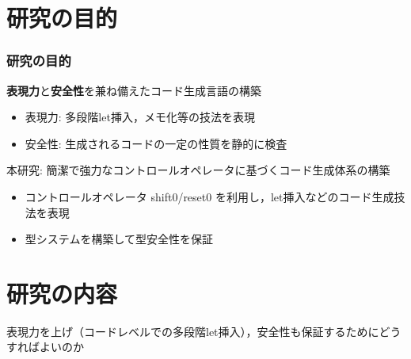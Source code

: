 
\section{研究の目的}
\begin{frame}
  \frametitle{研究の目的}

  \begin{block}{\textbf{表現力}と\textbf{安全性}を兼ね備えたコード生成言語の構築}
    \begin{itemize}
    \item 表現力: 多段階let挿入，メモ化等の技法を表現
    \item 安全性: 生成されるコードの一定の性質を静的に検査
    \end{itemize}
  \end{block}

  \medskip
  \pause
  \begin{block}{本研究: 簡潔で強力なコントロールオペレータに基づくコード生成体系の構築}
    \begin{itemize}
    \item コントロールオペレータ shift0/reset0 を利用し，let挿入などのコード生成技法を表現
    \item 型システムを構築して型安全性を保証
    \end{itemize}
  \end{block}
\end{frame}

\section{研究の内容}

\begin{frame}
  \center
  \huge{表現力を上げ（コードレベルでの多段階let挿入），安全性も保証するためにどうすればよいのか}
\end{frame}

